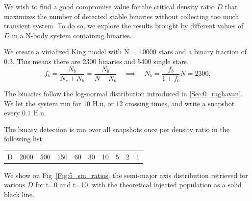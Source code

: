We wish to find a good compromise value for the critical density ratio $D$ that maximizes the number of detected stable binaries without collecting too much transient system. To do so, we explore the results brought by different values of $D$ in a N-body system containing binaries.

We create a virialized King model with N = 10000 stars and a binary fraction of 0.3. This means there are 2300 binaries and 5400 single stars,
\begin{equation}
f_b = \frac{N_b}{N_s + N_b} = \frac{N_b}{N-N_b} \quad \implies \quad N_b = \frac{f_b}{1+f_b} N = 2300.
\end{equation}

The binaries follow the \cite{Raghavan2010} log-normal distribution introduced in \ref{Sec:0_raghavan}. We let the system run for 10 H.u, or 12 crossing times, and write a snapshot every 0.1 H.u.

The binary detection is ran over all snapshots once per density ratio in the following list:

\begin{center}
\begin{tabular}{l|rrrrrrrrr}
\centering
D  &  2000 & 500 & 150 & 60 & 30 & 10 & 5 & 2 & 1\\ 
\end{tabular}
\end{center}

We show on Fig~\ref{Fig:5_sm_ratios} the semi-major axis distribution retrieved for various $D$ for t=0 and t=10, with the theoretical injected population as a solid black line.



